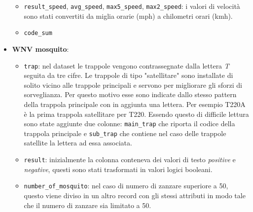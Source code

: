 \begin{itemize}
\begin{itemize}
            \item \texttt{result\_speed}, \texttt{avg\_speed}, \texttt{max5\_speed}, \texttt{max2\_speed}: i valori di velocità sono stati convertiti 
                da miglia orarie (mph) a chilometri orari (kmh).
                
            \item \texttt{code\_sum} %

        \end{itemize}
	
	\item \textbf{WNV mosquito}:
	
	\begin{itemize}
		
		\item \texttt{trap}: nel dataset le trappole vengono contrassegnate dalla lettera \textit{T} seguita da tre cifre. Le trappole di tipo "satellitare" sono installate di solito vicino alle trappole principali e servono per migliorare gli sforzi di sorveglianza. Per questo motivo esse sono indicate dallo stesso pattern della trappola principale con in aggiunta una lettera. Per esempio T220A è la prima trappola satellitare per T220. Essendo questo di difficile lettura sono state aggiunte due colonne: \texttt{main\_trap} che riporta il codice della trappola principale e \texttt{sub\_trap} che contiene nel caso delle trappole satellite la lettera ad essa associata.
		
		\item \texttt{result}: inizialmente la colonna conteneva dei valori di testo \textit{positive} e \textit{negative}, questi sono stati trasformati in valori logici booleani.  
		
		\item \texttt{number\_of\_mosquito}: nel caso di numero di zanzare superiore a 50, questo viene diviso in un altro record con gli stessi attributi in modo tale che il numero di zanzare sia limitato a 50.  
			
	\end{itemize}
	
\end{itemize}

